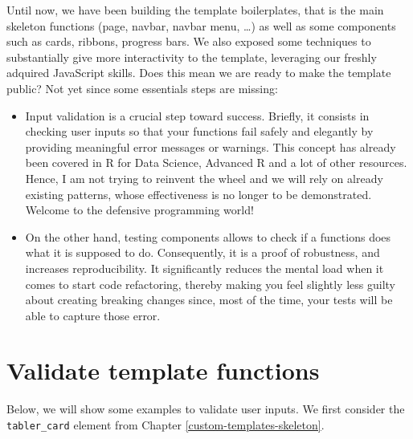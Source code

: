 \documentclass[]{book}
\providecommand{\tightlist}{%
  \setlength{\itemsep}{0pt}\setlength{\parskip}{0pt}}
\begin{document}
Until now, we have been building the template boilerplates, that is the main skeleton functions (page, navbar, navbar menu, \ldots{}) as well as some components such as cards, ribbons, progress bars. We also exposed some techniques to substantially give more interactivity to the template, leveraging our freshly adquired JavaScript skills. Does this mean we are ready to make the template public? Not yet since some essentials steps are missing:

\begin{itemize}
\tightlist
\item
  Input validation is a crucial step toward success. Briefly, it consists in checking user inputs so that your functions fail safely and elegantly by providing meaningful error messages or warnings. This concept has already been covered in R for Data Science, Advanced R and a lot of other resources. Hence, I am not trying to reinvent the wheel and we will rely on already existing patterns, whose effectiveness is no longer to be demonstrated. Welcome to the defensive programming world!
\item
  On the other hand, testing components allows to check if a functions does what it is supposed to do. Consequently, it is a proof of robustness, and increases reproducibility. It significantly reduces the mental load when it comes to start code refactoring, thereby making you feel slightly less guilty about creating breaking changes since, most of the time, your tests will be able to capture those error.
\end{itemize}

\hypertarget{validate-template-functions}{%
\section{Validate template functions}\label{validate-template-functions}}

Below, we will show some examples to validate user inputs. We first consider the \texttt{tabler\_card} element from Chapter \ref{custom-templates-skeleton}.
\end{document}

